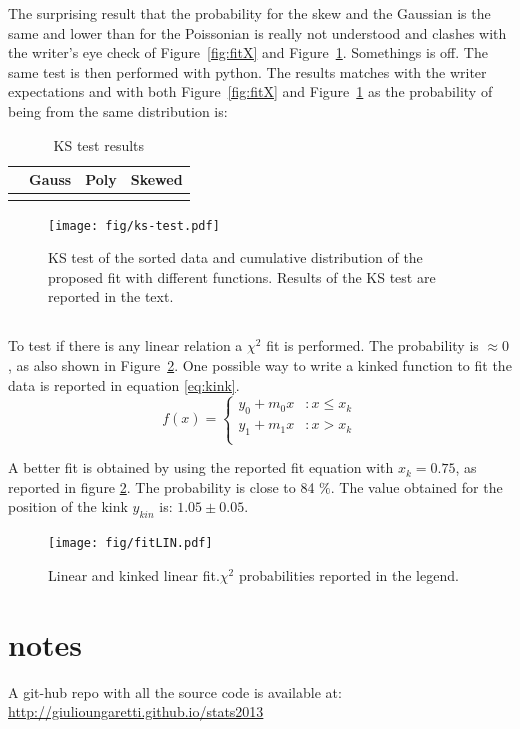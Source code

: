 \documentclass[twocolumn]{article}
\begin{document}
	The surprising result that the probability for the skew and the Gaussian is the same and lower than for the Poissonian is really not understood and clashes with the writer's eye check of Figure~\ref{fig:fitX} and Figure~\ref{fig:test}.
	Somethings is off. 
	The same test is then performed  with python. The results matches with the writer expectations and with  both Figure~\ref{fig:fitX} and Figure~\ref{fig:test} as the probability of being from the same distribution is:
	\begin{table}[tb]
		\caption{KS test results}
		\label{tab:tests}
		\begin{center}
			\begin{tabular}{l|ccc}
			\hline
	
			\hline
			\textbf{} & \textbf{Gauss} & \textbf{Poly} &  \textbf{Skewed} \\
			\hline
				 & & \\
			\hline
	
			\hline
			\end{tabular}
		\end{center}
	\end{table}


	\begin{figure}[h!]
		\begin{center}
			\texttt{[image: fig/ks-test.pdf]}
		\end{center}
		\caption{KS test of the sorted data and cumulative distribution of the proposed fit with different functions. Results  of the KS test are reported in the text.}
		\label{fig:test}
	\end{figure}

\subsection{}
To test if there is any linear relation a $\chi^2$ fit is performed. The probability is $\approx 0 $, as also shown in Figure~\ref{fig:fitLIN}.
One possible way to write a kinked function to fit the data is reported in equation \ref{eq:kink}.
\begin{equation}
\label{eq:kink}
	  f(x) = \left\{
     \begin{array}{lr}
       y_0 + m_0 x  & : x \le x_k \\
       y_1 + m_1 x  & : x > x_k \\
     \end{array}
   \right.
\end{equation}

A better fit is obtained by using the reported fit equation with $x_k =0.75$, as reported in figure \ref{fig:fitLIN}. The probability is close to 84 $\%$.
The value obtained for the position of the kink $y_{kin}$ is: $1.05 \pm 0.05$.
\begin{figure}[h!]
	\begin{center}
		\texttt{[image: fig/fitLIN.pdf]}
	\end{center}
	\caption{Linear and kinked linear fit.$\chi ^2$ probabilities reported in the legend.}
	\label{fig:fitLIN}
\end{figure}



\section{notes}
A git-hub repo with all the source code is available at:
\url{http://giulioungaretti.github.io/stats2013}
\end{document}
